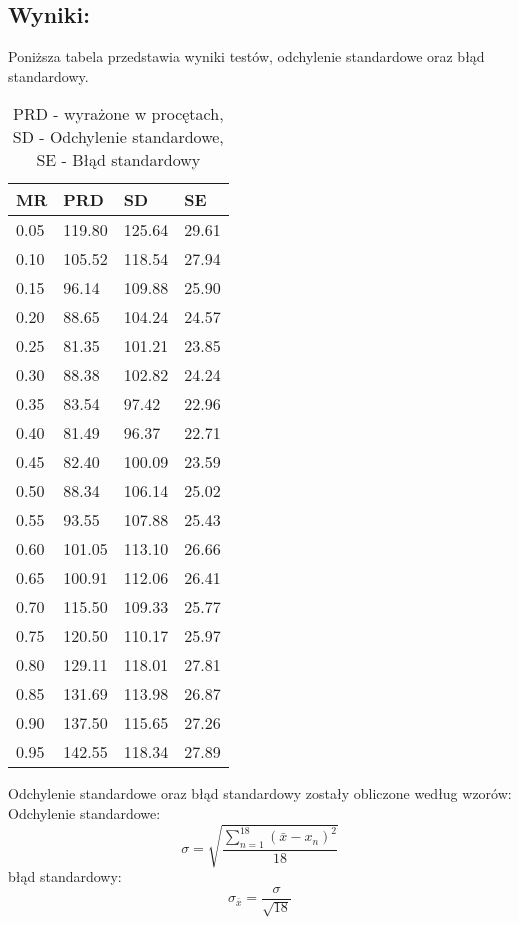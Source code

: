   \subsection{Wyniki: }
  Poniższa tabela przedstawia wyniki testów, odchylenie standardowe oraz błąd standardowy.
  \begin{table}[!ht]
    \centering
    \begin{tabular}{|l|l|l|l|}
    \hline
        MR & PRD & SD & SE \\ \hline
        0.05 & 119.80 & 125.64 & 29.61 \\ \hline
        0.10 & 105.52 & 118.54 & 27.94 \\ \hline
        0.15 & 96.14 & 109.88 & 25.90 \\ \hline
        0.20 & 88.65 & 104.24 & 24.57 \\ \hline
        0.25 & 81.35 & 101.21 & 23.85 \\ \hline
        0.30 & 88.38 & 102.82 & 24.24 \\ \hline
        0.35 & 83.54 & 97.42 & 22.96 \\ \hline
        0.40 & 81.49 & 96.37 & 22.71 \\ \hline
        0.45 & 82.40 & 100.09 & 23.59 \\ \hline
        0.50 & 88.34 & 106.14 & 25.02 \\ \hline
        0.55 & 93.55 & 107.88 & 25.43 \\ \hline
        0.60 & 101.05 & 113.10 & 26.66 \\ \hline
        0.65 & 100.91 & 112.06 & 26.41 \\ \hline
        0.70 & 115.50 & 109.33 & 25.77 \\ \hline
        0.75 & 120.50 & 110.17 & 25.97 \\ \hline
        0.80 & 129.11 & 118.01 & 27.81 \\ \hline
        0.85 & 131.69 & 113.98 & 26.87 \\ \hline
        0.90 & 137.50 & 115.65 & 27.26 \\ \hline
        0.95 & 142.55 & 118.34 & 27.89 \\ \hline
    \end{tabular}
    \caption{PRD - wyrażone w procętach, SD - Odchylenie standardowe, SE - Błąd standardowy}
  \end{table}

  Odchylenie standardowe oraz błąd standardowy zostały obliczone według wzorów: \\
  Odchylenie standardowe:
  \[ \sigma = \sqrt{\frac{\sum_{n = 1}^{18}(\bar{x} - x_n)^2}{18}} \]
  błąd standardowy:
  \[ \sigma_{\bar{x}} = \frac{\sigma}{\sqrt{18}} \]

